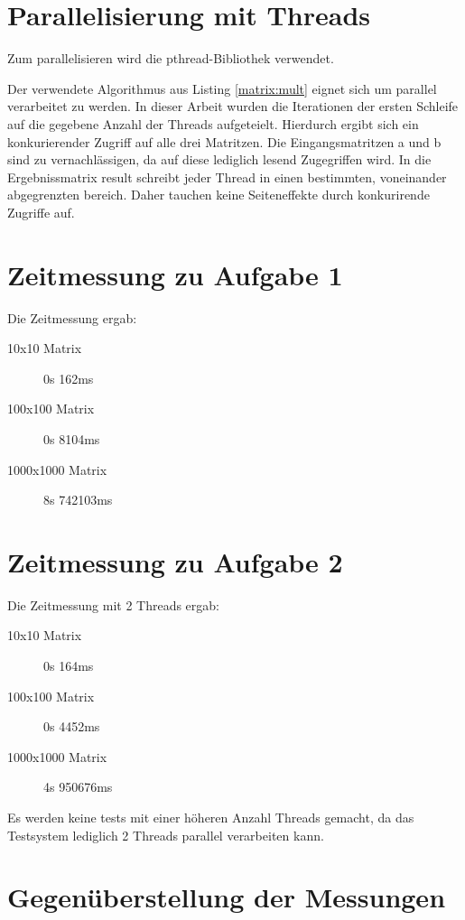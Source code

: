 \documentclass[a4paper]{article}
\begin{document}
\section{Parallelisierung mit Threads}

Zum parallelisieren wird die pthread-Bibliothek verwendet.

Der verwendete Algorithmus aus Listing \ref{matrix:mult} eignet sich um
parallel verarbeitet zu werden. In dieser Arbeit wurden die Iterationen der
ersten Schleife auf die gegebene Anzahl der Threads aufgeteielt.
Hierdurch ergibt sich ein konkurierender Zugriff auf alle drei Matritzen.
Die Eingangsmatritzen a und b sind zu vernachlässigen, da auf diese lediglich
lesend Zugegriffen wird. In die Ergebnissmatrix result schreibt jeder Thread in einen
bestimmten, voneinander abgegrenzten bereich. Daher tauchen keine Seiteneffekte
durch konkurirende Zugriffe auf.

\section{Zeitmessung zu Aufgabe 1}

Die Zeitmessung ergab:
\begin{description}
\item[10x10 Matrix] 0s 162ms
\item[100x100 Matrix]  0s 8104ms
\item[1000x1000 Matrix] 8s 742103ms
\end{description}

\section{Zeitmessung zu Aufgabe 2}

Die Zeitmessung mit 2 Threads ergab:
\begin{description}
\item[10x10 Matrix] 0s 164ms
\item[100x100 Matrix]  0s 4452ms
\item[1000x1000 Matrix] 4s 950676ms
\end{description}
Es werden keine tests mit einer höheren Anzahl Threads gemacht, da das 
Testsystem lediglich 2 Threads parallel verarbeiten kann.

\section{Gegenüberstellung der Messungen}
\end{document}
